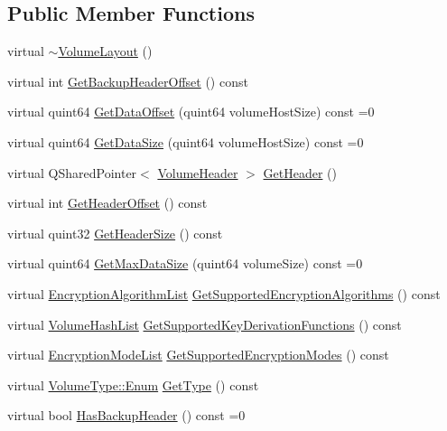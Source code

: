 \subsection*{Public Member Functions}
\begin{DoxyCompactItemize}
\item 
virtual \hyperlink{class_gost_crypt_1_1_volume_1_1_volume_layout_ac076a1abab57e2e7571ca06d743a78ea}{$\sim$\+Volume\+Layout} ()
\item 
virtual int \hyperlink{class_gost_crypt_1_1_volume_1_1_volume_layout_a406eb2e1642bfe76ed3a3856e10b3dce}{Get\+Backup\+Header\+Offset} () const
\item 
virtual quint64 \hyperlink{class_gost_crypt_1_1_volume_1_1_volume_layout_a967b9498adca758a2c721bdfb102e9a9}{Get\+Data\+Offset} (quint64 volume\+Host\+Size) const =0
\item 
virtual quint64 \hyperlink{class_gost_crypt_1_1_volume_1_1_volume_layout_ac0ead260317df3a9fd15518dc56a7d62}{Get\+Data\+Size} (quint64 volume\+Host\+Size) const =0
\item 
virtual Q\+Shared\+Pointer$<$ \hyperlink{class_gost_crypt_1_1_volume_1_1_volume_header}{Volume\+Header} $>$ \hyperlink{class_gost_crypt_1_1_volume_1_1_volume_layout_a97d7492068bd039d151c0ba2e78c3f2e}{Get\+Header} ()
\item 
virtual int \hyperlink{class_gost_crypt_1_1_volume_1_1_volume_layout_a4ee86fb93d04ee30404d40209f7625de}{Get\+Header\+Offset} () const
\item 
virtual quint32 \hyperlink{class_gost_crypt_1_1_volume_1_1_volume_layout_ac4c7306881a87c199d6a03edda253325}{Get\+Header\+Size} () const
\item 
virtual quint64 \hyperlink{class_gost_crypt_1_1_volume_1_1_volume_layout_a55eb89c0c90553250e50138c990bbfac}{Get\+Max\+Data\+Size} (quint64 volume\+Size) const =0
\item 
virtual \hyperlink{namespace_gost_crypt_1_1_volume_ae58c307b345c639d35f6dc68af4017b5}{Encryption\+Algorithm\+List} \hyperlink{class_gost_crypt_1_1_volume_1_1_volume_layout_a54d3253ba1f2ddc2509b5e59e33094fb}{Get\+Supported\+Encryption\+Algorithms} () const
\item 
virtual \hyperlink{namespace_gost_crypt_1_1_volume_a513257938e5ea0554ad83d0eb08f8f67}{Volume\+Hash\+List} \hyperlink{class_gost_crypt_1_1_volume_1_1_volume_layout_a4d61439dda6f363bf2ac1bd8bda7aaf3}{Get\+Supported\+Key\+Derivation\+Functions} () const
\item 
virtual \hyperlink{namespace_gost_crypt_1_1_volume_a94b281aaee6b2ca9317cf8bf25605f79}{Encryption\+Mode\+List} \hyperlink{class_gost_crypt_1_1_volume_1_1_volume_layout_ada1c5ebe5969b6d8d0b4e5d3207cbfb7}{Get\+Supported\+Encryption\+Modes} () const
\item 
virtual \hyperlink{struct_gost_crypt_1_1_volume_1_1_volume_type_a7fe1979dab76d4534dcb1e26179d4717}{Volume\+Type\+::\+Enum} \hyperlink{class_gost_crypt_1_1_volume_1_1_volume_layout_a86e831db4065d301328351507aca7eb0}{Get\+Type} () const
\item 
virtual bool \hyperlink{class_gost_crypt_1_1_volume_1_1_volume_layout_a4f88c450f745ca0da3d74700b89d5756}{Has\+Backup\+Header} () const =0
\end{DoxyCompactItemize}
